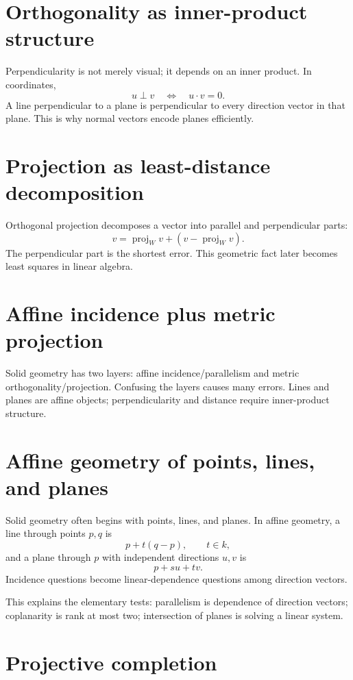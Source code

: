 \section{Orthogonality as inner-product structure}

Perpendicularity is not merely visual; it depends on an inner product.  In coordinates,
\[
  u\perp v\quad\Longleftrightarrow\quad u\cdot v=0.
\]
A line perpendicular to a plane is perpendicular to every direction vector in that plane.  This is why normal vectors encode planes efficiently.

\section{Projection as least-distance decomposition}

Orthogonal projection decomposes a vector into parallel and perpendicular parts:
\[
  v=\operatorname{proj}_W v+(v-\operatorname{proj}_W v).
\]
The perpendicular part is the shortest error.  This geometric fact later becomes least squares in linear algebra.

\section{Affine incidence plus metric projection}

Solid geometry has two layers: affine incidence/parallelism and metric orthogonality/projection.  Confusing the layers causes many errors.  Lines and planes are affine objects; perpendicularity and distance require inner-product structure.

\section{Affine geometry of points, lines, and planes}

Solid geometry often begins with points, lines, and planes.  In affine geometry, a line through points $p,q$ is
\[
  p+t(q-p),\qquad t\in k,
\]
and a plane through $p$ with independent directions $u,v$ is
\[
  p+su+tv.
\]
Incidence questions become linear-dependence questions among direction vectors.

This explains the elementary tests: parallelism is dependence of direction vectors; coplanarity is rank at most two; intersection of planes is solving a linear system.

\section{Projective completion}

